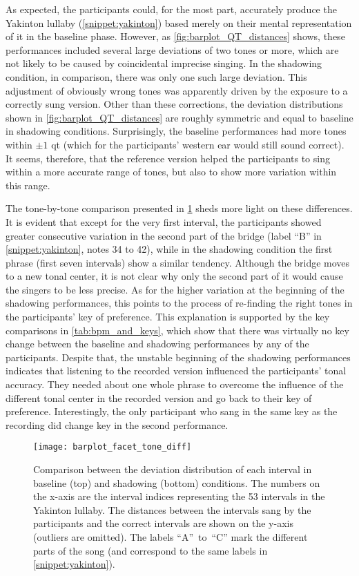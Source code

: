 As expected, the participants could, for the most part, accurately produce the Yakinton lullaby (\cref{snippet:yakinton}) based merely on their mental representation of it in the baseline phase.
However, as \cref{fig:barplot_QT_distances} shows, these performances included several large deviations of two tones or more, which are not likely to be caused by coincidental imprecise singing.
In the shadowing condition, in comparison, there was only one such large deviation.
This adjustment of obviously wrong tones was apparently driven by the exposure to a correctly sung version.
Other than these corrections, the deviation distributions shown in \cref{fig:barplot_QT_distances} are roughly symmetric and equal to baseline in shadowing conditions.
Surprisingly, the baseline performances had more tones within $\pm1$ \ac{qt} (which for the participants' western ear would still sound correct).
It seems, therefore, that the reference version helped the participants to sing within a more accurate range of tones, but also to show more variation within this range.

The tone-by-tone comparison presented in \cref{fig:barplot_facet_tone_diff} sheds more light on these differences.
It is evident that except for the very first interval, the participants showed greater consecutive variation in the second part of the bridge (label \enquote{B} in \cref{snippet:yakinton}, notes 34 to 42), while in the shadowing condition the first phrase (first seven intervals) show a similar tendency.
Although the bridge moves to a new tonal center, it is not clear why only the second part of it would cause the singers to be less precise.
As for the higher variation at the beginning of the shadowing performances, this points to the process of re-finding the right tones in the participants' key of preference.
This explanation is supported by the key comparisons in \cref{tab:bpm_and_keys}, which show that there was virtually no key change between the baseline and shadowing performances by any of the participants.
Despite that, the unstable beginning of the shadowing performances indicates that listening to the recorded version influenced the participants' tonal accuracy.
They needed about one whole phrase to overcome the influence of the different tonal center in the recorded version and go back to their key of preference.
Interestingly, the only participant who sang in the same key as the recording did change key in the second performance.

\begin{figure}[t]
	\centering
	\texttt{[image: barplot\_facet\_tone\_diff]}
	\caption[Comparison of interval deviation between baseline and shadowing performances]
		{Comparison between the deviation distribution of each interval in baseline (top) and shadowing (bottom) conditions.
		The numbers on the x-axis are the interval indices representing the 53 intervals in the Yakinton lullaby.
		The distances between the intervals sang by the participants and the correct intervals are shown on the y-axis (outliers are omitted).
		The labels \enquote{A}~to~\enquote{C} mark the different parts of the song (and correspond to the same labels in \cref{snippet:yakinton}).}
	\label{fig:barplot_facet_tone_diff}
\end{figure}

